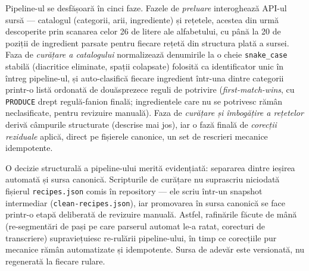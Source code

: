 Pipeline-ul se desfășoară în cinci faze. Fazele de \textit{preluare} interoghează API-ul sursă --- catalogul (categorii, arii, ingrediente) și rețetele, acestea din urmă descoperite prin scanarea celor 26 de litere ale alfabetului, cu până la 20 de poziții de ingredient parsate pentru fiecare rețetă din structura plată a sursei. Faza de \textit{curățare a catalogului} normalizează denumirile la o cheie \texttt{snake\_case} stabilă (diacritice eliminate, spații colapsate) folosită ca identificator unic în întreg pipeline-ul, și auto-clasifică fiecare ingredient într-una dintre categorii printr-o listă ordonată de douăsprezece reguli de potrivire (\textit{first-match-wins}, cu \texttt{PRODUCE} drept regulă-fanion finală; ingredientele care nu se potrivesc rămân neclasificate, pentru revizuire manuală). Faza de \textit{curățare și îmbogățire a rețetelor} derivă câmpurile structurate (descrise mai jos), iar o fază finală de \textit{corecții reziduale} aplică, direct pe fișierele canonice, un set de rescrieri mecanice idempotente.

O decizie structurală a pipeline-ului merită evidențiată: separarea dintre ieșirea automată și sursa canonică. Scripturile de curățare nu suprascriu niciodată fișierul \texttt{recipes.json} comis în repository --- ele scriu într-un snapshot intermediar (\texttt{clean-recipes.json}), iar promovarea în sursa canonică se face printr-o etapă deliberată de revizuire manuală. Astfel, rafinările făcute de mână (re-segmentări de pași pe care parserul automat le-a ratat, corecturi de transcriere) supraviețuiesc re-rulării pipeline-ului, în timp ce corecțiile pur mecanice rămân automatizate și idempotente. Sursa de adevăr este versionată, nu regenerată la fiecare rulare.

